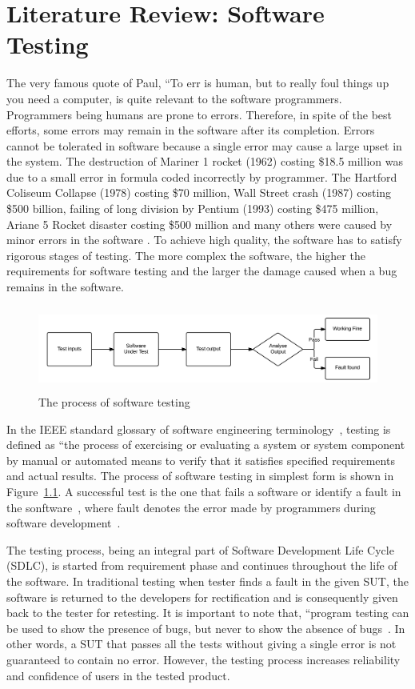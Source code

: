 \chapter{Literature Review: Software Testing}
\label{chap:softwareTesting}
The very famous quote of Paul, ``To err is human, but to really foul things up you need a computer, is quite relevant to the software programmers. Programmers being humans are prone to errors. Therefore, in spite of the best efforts, some errors may remain in the software after its completion.  Errors cannot be tolerated in software because a single error may cause a large upset in the system. The destruction of Mariner 1 rocket (1962) costing \$18.5 million was due to a small error in formula coded incorrectly by programmer. The Hartford Coliseum Collapse (1978) costing \$70 million, Wall Street crash (1987) costing \$500 billion, failing of long division by Pentium (1993) costing \$475 million, Ariane 5 Rocket disaster costing \$500 million and many others were caused by minor errors in the software \cite{toweysoftware}. To achieve high quality, the software has to satisfy rigorous stages of testing. The more complex the software, the higher the requirements for software testing and the larger the damage caused when a bug remains in the software.

\begin{figure}[h]
	\centering
	\includegraphics[width=13cm, height=2.8cm]{chapter2/softwareTesting.png}
	\caption{The process of software testing}
	\label{fig:softwareTesting}
\end{figure}

In the IEEE standard glossary of software engineering terminology~\cite{american1984}, testing is defined as ``the process of exercising or evaluating a system or system component by manual or automated means to verify that it satisfies specified requirements and actual results. The process of software testing in simplest form is shown in Figure~\ref{fig:softwareTesting}. A successful test is the one that fails a software or identify a fault in the sonftware~\cite{Myers1979}, where fault denotes the error made by programmers during software development~\cite{american1984}.

The testing process, being an integral part of Software Development Life Cycle (SDLC), is started from requirement phase and continues throughout the life of the software. In traditional testing when tester finds a fault in the given SUT, the software is returned to the developers for rectification and is consequently given back to the tester for retesting. It is important to note that, ``program testing can be used to show the presence of bugs, but never to show the absence of bugs~\cite{Dijkstra1972}. In other words, a SUT that passes all the tests without giving a single error is not guaranteed to contain no error. However, the testing process increases reliability and confidence of users in the tested product. 


